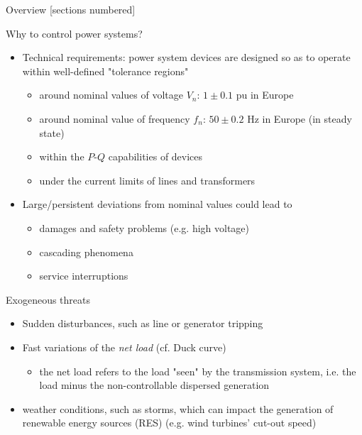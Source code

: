 \titleframe

\begin{frame}{Overview}
  [sections numbered]
  \tableofcontents[hideallsubsections]
\end{frame}





\begin{frame}{Why to control power systems?}
  \begin{itemize}
      \item Technical requirements: power system devices are designed so as to operate within well-defined "tolerance regions" 
      \begin{itemize}
        \item around nominal values of voltage $V_n$: $1 \pm 0.1$ pu in Europe
        \item around nominal value of frequency $f_n$: $50 \pm 0.2$  Hz in Europe (in steady state)
        \item within the $P$-$Q$ capabilities of devices
        \item under the current limits of lines and transformers
      \end{itemize} 
      \item Large/persistent deviations from nominal values could lead to 
      \begin{itemize}
        \item damages and safety problems (e.g. high voltage)
        \item cascading phenomena
        \item service interruptions
      \end{itemize}
      
  \end{itemize}
\end{frame}

\begin{frame}{Exogeneous threats}
  \begin{itemize}
      \item Sudden disturbances, such as line or generator tripping
      \item Fast variations of the \textit{net load} (cf. Duck curve)
      \begin{itemize}
        \item the net load refers to the load "seen" by the transmission system, i.e. the load minus the non-controllable dispersed generation
      \end{itemize}
      \item weather conditions, such as storms, which can impact the generation of renewable energy sources (RES) (e.g. wind turbines' cut-out speed)
  \end{itemize}
\end{frame}


